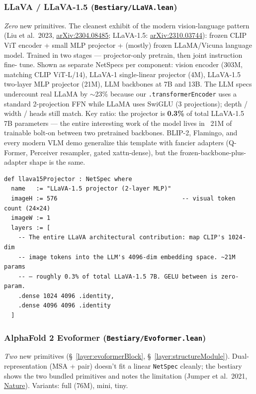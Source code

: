 \subsubsection*{LLaVA / LLaVA-1.5 (\texttt{Bestiary/LLaVA.lean})}
\emph{Zero} new primitives. The cleanest exhibit of the modern
vision-language pattern (Liu et al.\ 2023,
\href{https://arxiv.org/abs/2304.08485}{arXiv:2304.08485}; LLaVA-1.5:
\href{https://arxiv.org/abs/2310.03744}{arXiv:2310.03744}): frozen CLIP ViT encoder + small MLP
projector + (mostly) frozen LLaMA/Vicuna language model. Trained in
two stages --- projector-only pretrain, then joint instruction fine-
tune. Shown as separate NetSpecs per component: vision encoder
(303M, matching CLIP ViT-L/14), LLaVA-1 single-linear projector
(4M), LLaVA-1.5 two-layer MLP projector (21M), LLM backbones at 7B
and 13B. The LLM specs undercount real LLaMA by $\sim$23\% because
our \texttt{.transformerEncoder} uses a standard 2-projection FFN
while LLaMA uses SwiGLU (3 projections); depth / width / heads still
match. Key ratio: the projector is \textbf{0.3\%} of total LLaVA-1.5
7B parameters --- the entire interesting work of the model lives in
~21M of trainable bolt-on between two pretrained backbones. BLIP-2,
Flamingo, and every modern VLM demo generalize this template with
fancier adapters (Q-Former, Perceiver resampler, gated xattn-dense),
but the frozen-backbone-plus-adapter shape is the same.

\begin{verbatim}
def llava15Projector : NetSpec where
  name   := "LLaVA-1.5 projector (2-layer MLP)"
  imageH := 576                                   -- visual token count (24×24)
  imageW := 1
  layers := [
    -- The entire LLaVA architectural contribution: map CLIP's 1024-dim
    -- image tokens into the LLM's 4096-dim embedding space. ~21M params
    -- — roughly 0.3% of total LLaVA-1.5 7B. GELU between is zero-param.
    .dense 1024 4096 .identity,
    .dense 4096 4096 .identity
  ]
\end{verbatim}

\subsubsection*{AlphaFold 2 Evoformer (\texttt{Bestiary/Evoformer.lean})}
\emph{Two} new primitives (\S~\ref{layer:evoformerBlock},
\S~\ref{layer:structureModule}). Dual-representation (MSA + pair)
doesn't fit a linear \texttt{NetSpec} cleanly; the bestiary shows the
two bundled primitives and notes the limitation (Jumper et al.\ 2021,
\href{https://www.nature.com/articles/s41586-021-03819-2}{Nature}). Variants: full (76M), mini, tiny.

